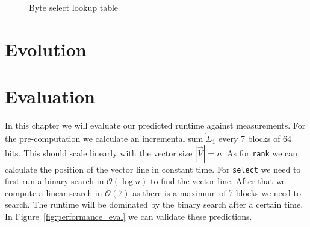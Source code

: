 \documentclass[a4paper,UKenglish,cleveref, autoref, thm-restate]{lipics-v2021}
\def\code#1{\texttt{#1}}
\newcommand\prevsum[0]{\ensuremath{\overset{\leftarrow}{\Sigma}_1}}
\begin{document}
\begin{figure}[htbp]
    \centering
    \caption{Byte select lookup table}
    \label{fig:select_lookup}
\end{figure}


\section{Evolution}

\section{Evaluation}
In this chapter we will evaluate our predicted runtime against measurements.
For the pre-computation we calculate an incremental sum $\prevsum$ every 7 blocks of 64 bits.
This should scale linearly with the vector size $|\vec{V}|=n$.
As for \code{rank} we can calculate the position of the vector line in constant time.
For \code{select} we need to first run a binary search in $\mathcal{O}(\log{n})$ to find the vector line.
After that we compute a linear search in $\mathcal{O}(7)$ as there is a maximum of 7 blocks we need to search.
The runtime will be dominated by the binary search after a certain time.
In Figure~\ref{fig:performance_eval} we can validate these predictions.
\end{document}
